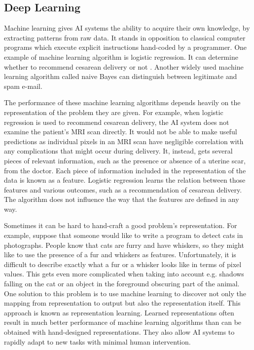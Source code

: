 \subsection{Deep Learning}

Machine learning gives AI systems the ability to acquire their own knowledge, by extracting patterns from raw data. It stands in opposition to classical computer programs which execute explicit instructions hand-coded by a programmer.
One example of machine learning algorithm is logistic regression. It can determine whether to recommend cesarean delivery or not \cite{Study.Cesarean}. Another widely used machine learning algorithm called naive Bayes can distinguish between legitimate and spam e-mail.

The performance of these machine learning algorithms depends heavily on the representation of the problem they are given. For example, when logistic regression is used to recommend cesarean delivery, the AI system does not examine the patient's MRI scan directly. It would not be able to make useful predictions as individual pixels in an MRI scan have negligible correlation with any complications that might occur during delivery. It, instead, gets several pieces of relevant information, such as the presence or absence of a uterine scar, from the doctor. Each piece of information included in the representation of the data is known as a feature. Logistic regression learns the relation between those features and various outcomes, such as a recommendation of cesarean delivery. The algorithm does not influence the way that the features are defined in any way.

Sometimes it can be hard to hand-craft a good problem's representation. For example, suppose that someone would like to write a program to detect cats in photographs. People know that cats are furry and have whiskers, so they might like to use the presence of a fur and whiskers as features. Unfortunately, it is difficult to describe exactly what a fur or a whisker looks like in terms of pixel values. This gets even more complicated when taking into account e.g. shadows falling on the cat or an object in the foreground obscuring part of the animal.
One solution to this problem is to use machine learning to discover not only the mapping from representation to output but also the representation itself. This approach is known as representation learning. Learned representations often result in much better performance of machine learning algorithms than can be obtained with hand-designed representations. They also allow AI systems to rapidly adapt to new tasks with minimal human intervention.

